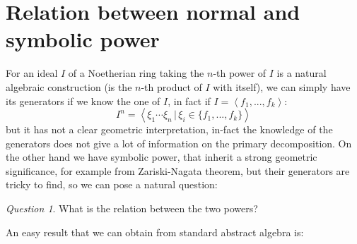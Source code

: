 \documentclass[notitlepage, a4]{book}
\theoremstyle{plain}
\theoremstyle{remark}
\newtheorem{que}[rem]{Question}
\theoremstyle{definition}
\newcounter{que}
\begin{document}

%



\section{Relation between normal and symbolic power}

For an ideal $ I $ of a Noetherian ring taking the $ n $-th power of $ I $ is a natural algebraic construction (is the $ n $-th product of $ I $ with itself), we can simply have its generators if we know the one of $ I $, in fact if $ I = \left\langle f_1 , ... ,f_k \right\rangle $:
\[ I^n = \left\langle \xi_1 \cdots \xi_n \,|\, \xi_i \in \{ f_1 , ... ,f_k \} \right\rangle \]
but it has not a clear geometric interpretation, in-fact the knowledge of the generators does not give a lot of information on the primary decomposition. On the other hand we have symbolic power, that inherit a strong geometric significance, for example from Zariski-Nagata theorem, but their generators are tricky to find, so we can pose a natural question:

\begin{que}
What is the relation between the two powers?
\end{que}

An easy result that we can obtain from standard abstract algebra is:
\end{document}
